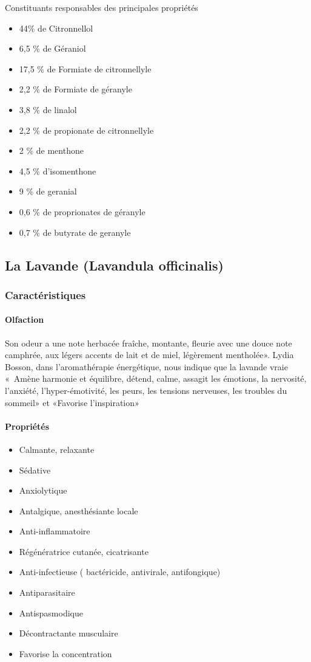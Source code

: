 \documentclass[12pt,a4wide]{article}
\begin{document}
Constituants responsables des principales propriétés
\begin{itemize}
\item 44\% de Citronnellol
\item 6,5 \% de Géraniol
\item 17,5 \% de Formiate de citronnellyle
\item 2,2 \% de Formiate de géranyle
\item 3,8 \% de linalol
\item 2,2 \% de propionate de citronnellyle
\item 2 \% de menthone
\item 4,5 \% d'isomenthone
\item 9 \% de geranial
\item 0,6 \% de proprionates de géranyle
\item 0,7 \% de butyrate de geranyle
\end{itemize}





\subsection{La Lavande (Lavandula officinalis)}
\label{sec-4-8}
\subsubsection{Caractéristiques}
\label{sec-4-8-1}
\paragraph{Olfaction}
\label{sec-4-8-1-1}
Son odeur a une note herbacée fraîche, montante, fleurie avec une douce note camphrée, aux légers accents de lait et de miel, légèrement mentholée». Lydia Bosson, dans l'aromathérapie énergétique, nous indique que la lavande vraie « Amène harmonie et équilibre, détend, calme, assagit les émotions, la nervosité, l'anxiété, l'hyper-émotivité, les peurs, les tensions nerveuses, les troubles du sommeil» et «Favorise l'inspiration»
\paragraph{Propriétés}
\label{sec-4-8-1-2}
\begin{itemize}
\item Calmante, relaxante
\item Sédative
\item Anxiolytique
\item Antalgique, anesthésiante locale
\item Anti-inflammatoire
\item Régénératrice cutanée, cicatrisante
\item Anti-infectieuse ( bactéricide, antivirale, antifongique)
\item Antiparasitaire
\item Antispasmodique
\item Décontractante musculaire
\item Favorise la concentration
\end{itemize}
\end{document}

